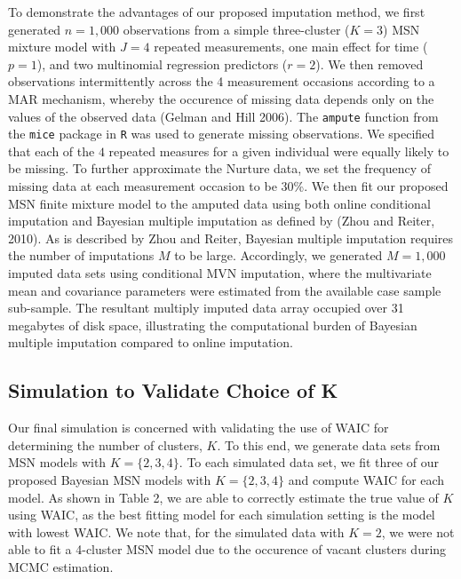 \documentclass[useAMS,referee]{biom}
\begin{document}
To demonstrate the advantages of our proposed imputation method, we first generated $n = 1,000$ observations from a simple three-cluster ($K = 3$) MSN mixture model with $J = 4$ repeated measurements, one main effect for time ($p = 1$), and two multinomial regression predictors ($r = 2$). We then removed observations intermittently across the 4 measurement occasions according to a MAR mechanism, whereby the occurence of missing data depends only on the values of the observed data (Gelman and Hill 2006). The \texttt{ampute} function from the \texttt{mice} package in \texttt{R} was used to generate missing observations. We specified that each of the $4$ repeated measures for a given individual were equally likely to be missing.  To further approximate the Nurture data, we set the frequency of missing data at each measurement occasion to be 30\%. We then fit our proposed MSN finite mixture model to the amputed data using both online conditional imputation and Bayesian multiple imputation as defined by (Zhou and Reiter, 2010). As is described by Zhou and Reiter, Bayesian multiple imputation requires the number of imputations $M$ to be large. Accordingly, we generated $M = 1,000$ imputed data sets using conditional MVN imputation, where the multivariate mean and covariance parameters were estimated from the available case sample sub-sample. The resultant multiply imputed data array occupied over 31 megabytes of disk space, illustrating the computational burden of Bayesian multiple imputation compared to online imputation.

\subsection{Simulation to Validate Choice of K}

Our final simulation is concerned with validating the use of WAIC for determining the number of clusters, $K$. To this end, we generate data sets from MSN models with $K = \{2,3,4\}$. To each simulated data set, we fit three of our proposed Bayesian MSN models with $K = \{2,3,4\}$ and compute WAIC for each model. As shown in Table 2, we are able to correctly estimate the true value of $K$ using WAIC, as the best fitting model for each simulation setting is the model with lowest WAIC. We note that, for the simulated data with $K = 2$, we were not able to fit a 4-cluster MSN model due to the occurence of vacant clusters during MCMC estimation. 
\end{document}
